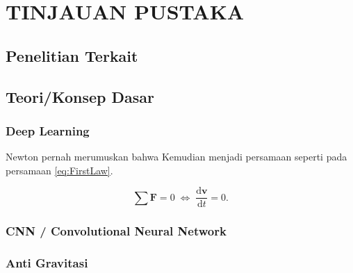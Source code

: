 \section{TINJAUAN PUSTAKA}

\subsection{Penelitian Terkait}
\lipsum[3]

\subsection{Teori/Konsep Dasar}

\subsubsection{Deep Learning}

Newton pernah merumuskan \citep{Newton1687} bahwa \lipsum[8]
Kemudian menjadi persamaan seperti pada persamaan \ref{eq:FirstLaw}.

\begin{equation}
  \label{eq:FirstLaw}
  \sum \mathbf{F} = 0\; \Leftrightarrow\; \frac{\mathrm{d} \mathbf{v} }{\mathrm{d}t} = 0.
\end{equation}

\subsubsection{CNN / Convolutional Neural Network}

\lipsum[9]

\subsubsection{Anti Gravitasi}

\lipsum[10]
